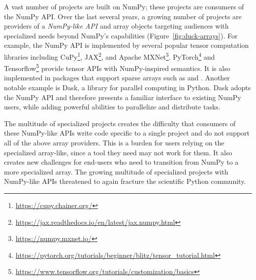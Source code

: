 
A vast number of projects are built on NumPy;
these projects are consumers of the NumPy API.
Over the last several years, a growing number of projects are providers of
a \emph{NumPy-like API} and array objects targeting audiences with specialized
needs beyond NumPy's capabilities (Figure~\ref{fig:duck-arrays}).
For example, the NumPy API is implemented by several popular tensor computation
libraries including CuPy\footnote{\url{https://cupy.chainer.org/}},
JAX\footnote{\url{https://jax.readthedocs.io/en/latest/jax.numpy.html}},
and Apache MXNet\footnote{\url{https://numpy.mxnet.io/}}.
PyTorch\footnote{\url{https://pytorch.org/tutorials/beginner/blitz/tensor\_tutorial.html}}
and Tensorflow\footnote{\url{https://www.tensorflow.org/tutorials/customization/basics}}
provide tensor APIs with NumPy-inspired semantics.
It is also implemented in packages that support sparse arrays
such as  and .
Another notable example is Dask, a library for parallel computing in
Python.  Dask adopts the NumPy API and therefore presents a familiar
interface to existing NumPy users, while adding powerful abilities to
parallelize and distribute tasks.


The multitude of specialized projects creates the difficulty that consumers
of these NumPy-like APIs write code specific to a single project and do not support
all of the above array providers.
This is a burden for users relying on the specialized array-like, since
a tool they need may not work for them.
It also creates new challenges for end-users who need to transition
from NumPy to a more specialized array.
The growing multitude of specialized projects with NumPy-like APIs threatened
to again fracture the scientific Python community.


